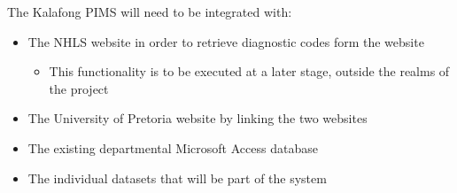 The Kalafong PIMS will need to be integrated with:
\begin{itemize}
	\item The NHLS website in order to retrieve diagnostic codes form the website
		\begin{itemize}
			\item This functionality is to be executed at a later stage, outside the realms of the project
		\end{itemize}
	\item The University of Pretoria website by linking the two websites
	\item The existing departmental Microsoft Access database
	\item The individual datasets that will be part of the system
\end{itemize}
